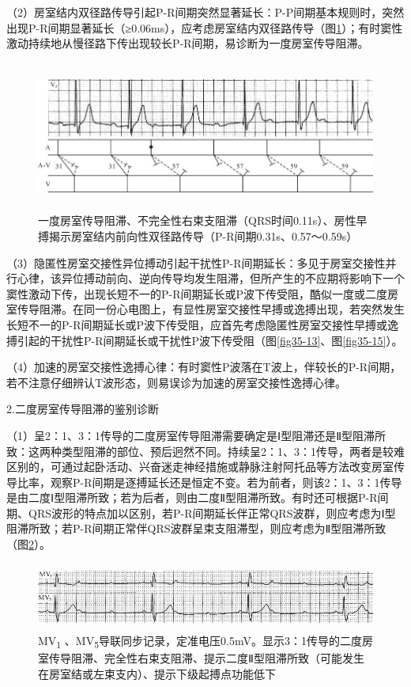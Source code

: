 （2）房室结内双径路传导引起P-R间期突然显著延长：P-P间期基本规则时，突然出现P-R间期显著延长（≥0.06ms），应考虑房室结内双径路传导（图\ref{fig20-14}）；有时窦性激动持续地从慢径路下传出现较长P-R间期，易诊断为一度房室传导阻滞。

\begin{figure}[!htbp]
 \centering
 \includegraphics[width=5.78125in,height=1.9375in]{./images/Image00343.jpg}
 \captionsetup{justification=centering}
 \caption{一度房室传导阻滞、不完全性右束支阻滞（QRS时间0.11s）、房性早搏揭示房室结内前向性双径路传导（P-R间期0.31s、0.57～0.59s）}
 \label{fig20-14}
  \end{figure} 

（3）隐匿性房室交接性异位搏动引起干扰性P-R间期延长：多见于房室交接性并行心律，该异位搏动前向、逆向传导均发生阻滞，但所产生的不应期将影响下一个窦性激动下传，出现长短不一的P-R间期延长或P波下传受阻，酷似一度或二度房室传导阻滞。在同一份心电图上，有显性房室交接性早搏或逸搏出现，若突然发生长短不一的P-R间期延长或P波下传受阻，应首先考虑隐匿性房室交接性早搏或逸搏引起的干扰性P-R间期延长或干扰性P波下传受阻（图\ref{fig35-13}、图\ref{fig35-15}）。

（4）加速的房室交接性逸搏心律：有时窦性P波落在T波上，伴较长的P-R间期，若不注意仔细辨认T波形态，则易误诊为加速的房室交接性逸搏心律。

2.二度房室传导阻滞的鉴别诊断

（1）呈2：1、3：1传导的二度房室传导阻滞需要确定是Ⅰ型阻滞还是Ⅱ型阻滞所致：这两种类型阻滞的部位、预后迥然不同。持续呈2：1、3：1传导，两者是较难区别的，可通过起卧活动、兴奋迷走神经措施或静脉注射阿托品等方法改变房室传导比率，观察P-R间期是逐搏延长还是恒定不变。若为前者，则该2：1、3：1传导是由二度Ⅰ型阻滞所致；若为后者，则由二度Ⅱ型阻滞所致。有时还可根据P-R间期、QRS波形的特点加以区别，若P-R间期延长伴正常QRS波群，则应考虑为Ⅰ型阻滞所致；若P-R间期正常伴QRS波群呈束支阻滞型，则应考虑为Ⅱ型阻滞所致（图\ref{fig20-15}）。

\begin{figure}[!htbp]
 \centering
 \includegraphics[width=5.58333in,height=0.875in]{./images/Image00344.jpg}
 \captionsetup{justification=centering}
 \caption{MV\textsubscript{1} 、MV\textsubscript{5}导联同步记录，定准电压0.5mV。显示3：1传导的二度房室传导阻滞、完全性右束支阻滞、提示二度Ⅱ型阻滞所致（可能发生在房室结或左束支内）、提示下级起搏点功能低下}
 \label{fig20-15}
  \end{figure} 


